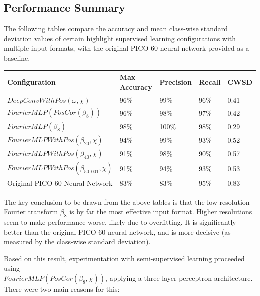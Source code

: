 \documentclass[10pt]{article}
\begin{document}
\subsection{Performance Summary}

The following tables compare the accuracy and mean class-wise standard deviation values of certain highlight supervised learning configurations with multiple input formats, with the original PICO-60 neural network provided as a baseline.

\begin{minipage}{\textwidth}
    \begin{center}
        \begin{tabular}{|l|l|l|l|l|}
            \hline
            Configuration & Max Accuracy & Precision & Recall & CWSD \\
            \hline
            $DeepConvWithPos(\omega, \chi)$ & 96\% & 99\% & 96\% & 0.41 \\
            \hline
            $FourierMLP(PosCor(\beta_{8}))$ & 96\% & 98\% & 97\% & 0.42 \\
            \hline
            $FourierMLP(\beta_{8})$ & 98\% & 100\% & 98\% & 0.29 \\
            \hline
            $FourierMLPWithPos(\beta_{20}, \chi)$ & 94\% & 99\% & 93\% & 0.52 \\
            \hline
            $FourierMLPWithPos(\beta_{40}, \chi)$ & 91\% & 98\% & 90\% & 0.57 \\
            \hline
            $FourierMLPWithPos(\beta_{50,001}, \chi)$ & 91\% & 94\% & 93\% & 0.53 \\
            \hline
            Original PICO-60 Neural Network & 83\% & 83\% & 95\% & 0.83 \\
            \hline
        \end{tabular}
    \end{center}
\end{minipage}

The key conclusion to be drawn from the above tables is that the low-resolution Fourier transform $\beta_{8}$ is by far the most effective input format. Higher resolutions seem to make performance worse, likely due to overfitting. It is significantly better than the original PICO-60 neural network, and is more decisive (as measured by the class-wise standard deviation).

Based on this result, experimentation with semi-supervised learning proceeded using \\ $FourierMLP(PosCor(\beta_{8}, \chi))$, applying a three-layer perceptron architecture. There were two main reasons for this:
\end{document}
